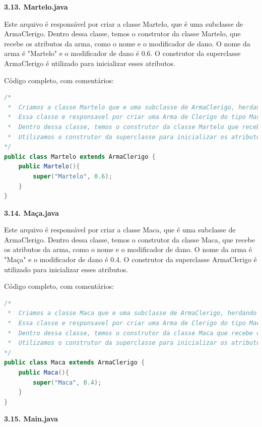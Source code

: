 \documentclass[11pt]{uiobrev}
\begin{document}
\newpage
\Large \textbf{3.13. Martelo.java}

Este arquivo é responsável por criar a classe Martelo, que é uma subclasse de ArmaClerigo. Dentro dessa classe, temos o construtor da classe Martelo, que recebe os atributos da arma, como o nome e o modificador de dano. O nome da arma é "Martelo" e o modificador de dano é 0.6. O construtor da superclasse ArmaClerigo é utilizado para inicializar esses atributos.

Código completo, com comentários: 

\begin{lstlisting}[language=Java, caption={Classe Martelo, subclasse de ArmaClerigo}]
/*
 *  Criamos a classe Martelo que e uma subclasse de ArmaClerigo, herdando os atributos de ArmaClerigo.
 *  Essa classe e responsavel por criar uma Arma de Clerigo do tipo Martelo.
 *  Dentro dessa classe, temos o construtor da classe Martelo que recebe o nome e o dano da arma.
 *  Utilizamos o construtor da superclasse para inicializar os atributos de ArmaClerigo.
*/
public class Martelo extends ArmaClerigo {
    public Martelo(){
        super("Martelo", 0.6);
    }
}
\end{lstlisting}

\vspace{0.5cm}
\Large \textbf{3.14. Maça.java}

Este arquivo é responsável por criar a classe Maca, que é uma subclasse de ArmaClerigo. Dentro dessa classe, temos o construtor da classe Maca, que recebe os atributos da arma, como o nome e o modificador de dano. O nome da arma é "Maça" e o modificador de dano é 0.4. O construtor da superclasse ArmaClerigo é utilizado para inicializar esses atributos.

Código completo, com comentários: 

\newpage
\begin{lstlisting}[language=Java, caption={Classe Maça, subclasse de ArmaClerigo}]
/*
 *  Criamos a classe Maca que e uma subclasse de ArmaClerigo, herdando os atributos de ArmaClerigo.
 *  Essa classe e responsavel por criar uma Arma de Clerigo do tipo Maca.
 *  Dentro dessa classe, temos o construtor da classe Maca que recebe o nome e o dano da arma.
 *  Utilizamos o construtor da superclasse para inicializar os atributos de ArmaClerigo.
*/
public class Maca extends ArmaClerigo {
    public Maca(){
        super("Maca", 0.4);
    }
}
\end{lstlisting}

\vspace{0.5cm}
\Large \textbf{3.15. Main.java}
\end{document}
